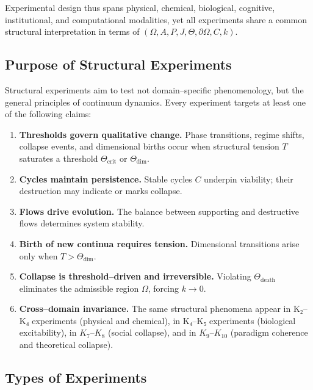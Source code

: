 Experimental design thus spans physical, chemical, biological, cognitive,
institutional, and computational modalities, yet all experiments share a
common structural interpretation in terms of $(\Omega, A, P, J, \Theta,
\partial\Omega, C, k)$.


\subsection{Purpose of Structural Experiments}

Structural experiments aim to test not domain–specific phenomenology, but the
general principles of continuum dynamics.
Every experiment targets at least one of the following claims:

\begin{enumerate}
    \item \textbf{Thresholds govern qualitative change.}
          Phase transitions, regime shifts, collapse events, and dimensional
          births occur when structural tension $T$ saturates a threshold
          $\Theta_{\mathrm{crit}}$ or $\Theta_{\mathrm{dim}}$.

    \item \textbf{Cycles maintain persistence.}
          Stable cycles $C$ underpin viability; their destruction may indicate or
          marks collapse.

    \item \textbf{Flows drive evolution.}
          The balance between supporting and destructive flows determines
          system stability.

    \item \textbf{Birth of new continua requires tension.}
          Dimensional transitions arise only when $T > \Theta_{\mathrm{dim}}$.

    \item \textbf{Collapse is threshold–driven and irreversible.}
          Violating $\Theta_{\mathrm{death}}$ eliminates the admissible region
          $\Omega$, forcing $k\to 0$.

    \item \textbf{Cross–domain invariance.}
          The same structural phenomena appear in K₂–K₄ experiments (physical
          and chemical), in K₄–K₅ experiments (biological excitability), in
          $K_7$–$K_8$ (social collapse), and in $K_9$–$K_{10}$ (paradigm coherence and
          theoretical collapse).
\end{enumerate}


\subsection{Types of Experiments}

